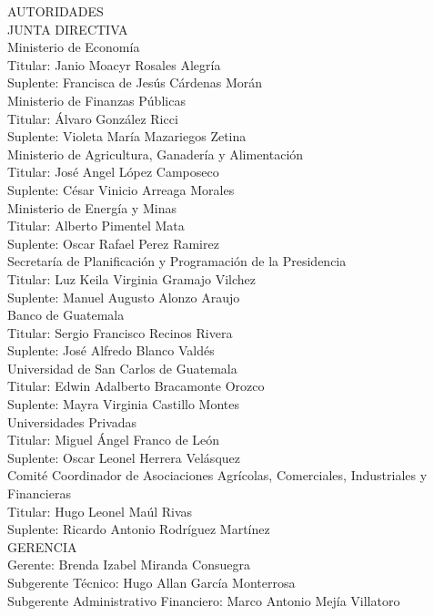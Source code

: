 {\Bold \LARGE AUTORIDADES}\\[1cm]
{\Bold \large \color{color1!89!black} JUNTA  DIRECTIVA} \\[0.4cm]
{\Bold Ministerio de Economía}\\ 
Titular: Janio Moacyr Rosales Alegría \\ 
Suplente: Francisca de Jesús Cárdenas Morán\\[0.4cm]

{\Bold Ministerio de Finanzas Públicas}\\ 
Titular: Álvaro González Ricci\\ 
Suplente: Violeta María Mazariegos Zetina\\[0.4cm]

{\Bold Ministerio de Agricultura, Ganadería y Alimentación}\\ 
Titular: José Angel López Camposeco\\ 
Suplente: César Vinicio Arreaga Morales\\[0.4cm]

{\Bold Ministerio de Energía y Minas}\\ 
Titular: Alberto Pimentel Mata\\ 
Suplente: Oscar Rafael Perez Ramirez\\[0.4cm]

{\Bold Secretaría de Planificación y Programación de la Presidencia}\\ 
Titular: Luz Keila Virginia Gramajo Vilchez\\ 
Suplente: Manuel Augusto Alonzo Araujo\\[0.4cm]

{\Bold Banco de Guatemala}\\ 
Titular: Sergio Francisco Recinos Rivera\\ 
Suplente: José Alfredo Blanco Valdés\\[0.4cm]

{\Bold Universidad de San Carlos de Guatemala}\\ 
Titular: Edwin Adalberto Bracamonte Orozco\\ 
Suplente: Mayra Virginia Castillo Montes\\[0.4cm]

{\Bold Universidades Privadas}\\ 
Titular: Miguel Ángel Franco de León\\ 
Suplente: Oscar Leonel Herrera Velásquez\\[0.4cm]

{\Bold Comité Coordinador de Asociaciones Agrícolas, Comerciales, Industriales y Financieras}\\ 
Titular: Hugo Leonel Maúl Rivas\\ 
Suplente: Ricardo Antonio Rodríguez Martínez\\[0.4cm]

{\Bold \large \color{color1!89!black} GERENCIA}\\[0.2cm]
Gerente: Brenda Izabel Miranda Consuegra\\ 
Subgerente Técnico: Hugo Allan García Monterrosa\\ 
Subgerente Administrativo Financiero: Marco Antonio Mejía Villatoro\\ 
